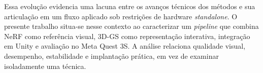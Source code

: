 Essa evolução evidencia uma lacuna entre os avanços técnicos dos métodos e sua articulação em um fluxo aplicado sob restrições de hardware \textit{standalone}. O presente trabalho situa-se nesse contexto ao caracterizar um \textit{pipeline} que combina NeRF como referência visual, 3D-GS como representação interativa, integração em Unity e avaliação no Meta Quest 3S. A análise relaciona qualidade visual, desempenho, estabilidade e implantação prática, em vez de examinar isoladamente uma técnica.
